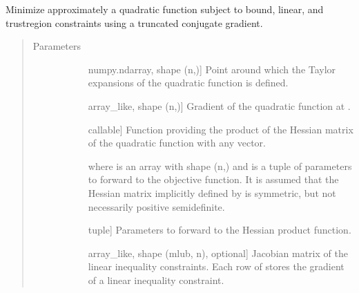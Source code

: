 \documentclass[letterpaper,10pt,english]{sphinxmanual}
\begin{document}
\begin{fulllineitems}
\label{\detokenize{refs/generated/cobyqa.linalg.lctcg:cobyqa.linalg.lctcg}}
\sphinxAtStartPar
Minimize approximately a quadratic function subject to bound, linear, and
trust\sphinxhyphen{}region constraints using a truncated conjugate gradient.
\begin{quote}\begin{description}
\item[{Parameters}] \leavevmode\begin{description}
\item[{}] \leavevmode{[}numpy.ndarray, shape (n,){]}
\sphinxAtStartPar
Point around which the Taylor expansions of the quadratic function is
defined.

\item[{}] \leavevmode{[}array\_like, shape (n,){]}
\sphinxAtStartPar
Gradient of the quadratic function at .

\item[{}] \leavevmode{[}callable{]}
\sphinxAtStartPar
Function providing the product of the Hessian matrix of the quadratic
function with any vector.
\begin{quote}

\sphinxAtStartPar
{}
\end{quote}

\sphinxAtStartPar
where  is an array with shape (n,) and  is a tuple of
parameters to forward to the objective function. It is assumed that the
Hessian matrix implicitly defined by  is symmetric, but not
necessarily positive semidefinite.

\item[{}] \leavevmode{[}tuple{]}
\sphinxAtStartPar
Parameters to forward to the Hessian product function.

\item[{}] \leavevmode{[}array\_like, shape (mlub, n), optional{]}
\sphinxAtStartPar
Jacobian matrix of the linear inequality constraints. Each row of 
stores the gradient of a linear inequality constraint.


\end{description}
\end{description}
\end{quote}
\end{fulllineitems}
\end{document}
